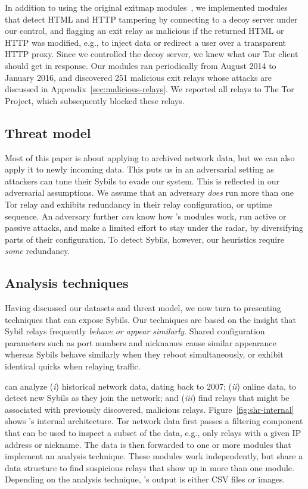 In addition to using the original exitmap modules~\cite[\S~3.1]{Winter2014a},
we implemented modules that detect HTML and HTTP tampering by connecting to a
decoy server under our control, and flagging an exit relay as malicious if the
returned HTML or HTTP was modified, e.g., to inject data or redirect a user
over a transparent HTTP proxy.  Since we controlled the decoy server, we knew
what our Tor client should get in response.  Our modules ran periodically from
August 2014 to January 2016, and discovered 251 malicious exit relays whose
attacks are discussed in Appendix~\ref{sec:malicious-relays}.  We reported all
relays to The Tor Project, which subsequently blocked these relays.

\subsection{Threat model}
\label{sec:threat_model}
Most of this paper is about applying \sys to archived network data, but we can
also apply it to newly incoming data.  This puts us in an adversarial setting
as attackers can tune their Sybils to evade our system.  This is reflected in
our adversarial assumptions.  We assume that an adversary \emph{does} run more
than one Tor relay and exhibits redundancy in their relay configuration, or
uptime sequence.  An adversary further \emph{can} know how \sys's modules work,
run active or passive attacks, and make a limited effort to stay under the
radar, by diversifying parts of their configuration.  To detect Sybils,
however, our heuristics require \emph{some} redundancy.

\subsection{Analysis techniques}
\label{sec:techniques}
Having discussed our datasets and threat model, we now turn to presenting
techniques that can expose Sybils.  Our techniques are based on the insight
that Sybil relays frequently \emph{behave or appear similarly}.  Shared
configuration parameters such as port numbers and nicknames cause similar
appearance whereas Sybils behave similarly when they reboot simultaneously, or
exhibit identical quirks when relaying traffic.

\Sys can analyze (\emph{i}) historical network data, dating back to 2007;
(\emph{ii}) online data, to detect new Sybils as they join the network; and
(\emph{iii}) find relays that might be associated with previously discovered,
malicious relays.  Figure~\ref{fig:shr-internal} shows \sys's internal
architecture.  Tor network data first passes a filtering component that can be
used to inspect a subset of the data, e.g., only relays with a given IP address
or nickname.  The data is then forwarded to one or more modules that implement
an analysis technique.  These modules work independently, but share a data
structure to find suspicious relays that show up in more than one module.
Depending on the analysis technique, \sys's output is either CSV files or
images.


